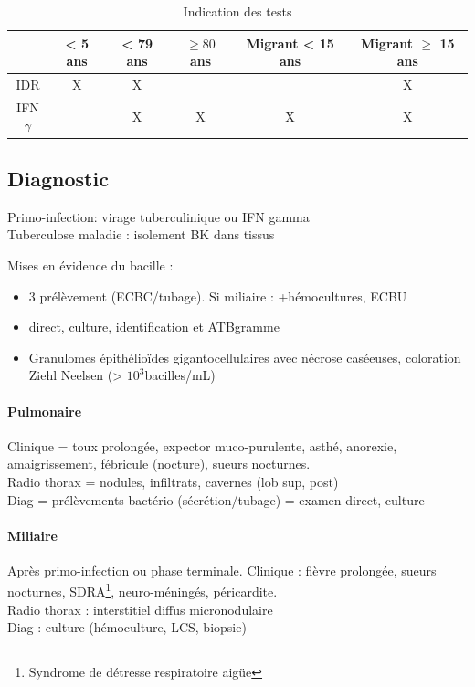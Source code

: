 \begin{table}[htpb]
  \centering
  \caption{Indication des tests}
  \begin{tabular}{*{6}{c}}
    \toprule
  & < 5 ans & < 79 ans & $\ge 80$ ans & Migrant < 15 ans & Migrant $\ge$ 15 ans \\
  \midrule
  IDR         & X & X &   &   & X \\
  IFN$\gamma$ &   & X & X & X & X \\
  \bottomrule
  \end{tabular}
\end{table}

\subsection{Diagnostic}%
\begin{tcolorbox}
  Primo-infection: virage tuberculinique ou IFN gamma\\
  Tuberculose maladie : isolement BK dans tissus
\end{tcolorbox}
Mises en évidence du bacille :
\begin{itemize}
\item 3 prélèvement (ECBC/tubage). Si miliaire : +hémocultures, ECBU
\item direct, culture, identification et ATBgramme
\item Granulomes épithélioïdes gigantocellulaires avec nécrose caséeuses,
  coloration Ziehl Neelsen (> $10^3$bacilles/mL)
\end{itemize}

\paragraph{Pulmonaire} Clinique = toux prolongée, expector muco-purulente,
{asthé, anorexie, amaigrissement, fébricule (nocture), sueurs nocturnes}.\\
Radio thorax = nodules, infiltrats, cavernes (lob sup, post)\\
Diag = prélèvements bactério (sécrétion/tubage) = examen direct, culture

\paragraph{Miliaire} Après primo-infection ou phase terminale.
Clinique : fièvre prolongée, sueurs nocturnes, SDRA\footnote{Syndrome de
détresse respiratoire aigüe}, neuro-méningés,
péricardite.\\
Radio thorax : interstitiel diffus micronodulaire\\
Diag : culture (hémoculture, LCS, biopsie)

